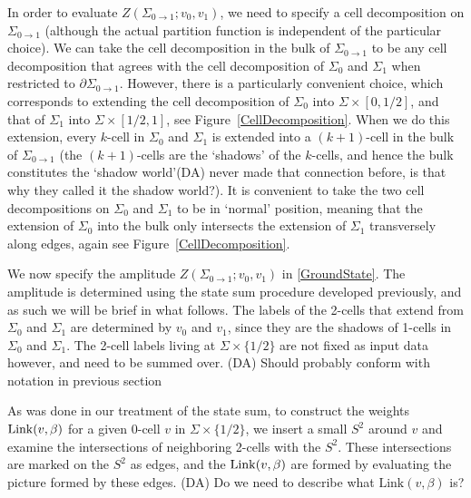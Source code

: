 \documentclass[12pt,a4paper]{article}
\newcounter{arrow}
\newcommand{\ra}{\rightarrow}
\newcommand{\dave}[1]{{\color{ao(english)}\footnotesize{(DA) #1}}}
\begin{document}
In order to evaluate $Z(\Sigma_{0\ra1}; v_0, v_1)$, we need to specify a cell decomposition on $\Sigma_{0\ra 1}$ (although the actual partition function is independent of the particular choice). 
We can take the cell decomposition in the bulk of $\Sigma_{0\ra1}$ to be any cell decomposition that agrees with the cell decomposition of $\Sigma_0$ and $\Sigma_1$ when restricted to $\partial \Sigma_{0\ra1}$.
However, there is a particularly convenient choice, which corresponds to extending the cell decomposition of $\Sigma_0$ into $\Sigma \times [0, 1/2]$, and that of $\Sigma_1$ into $\Sigma \times [1/2, 1]$, see Figure~\ref{CellDecomposition}. 
When we do this extension, every $k$-cell in $\Sigma_0$ and $\Sigma_1$ is extended into a $(k+1)$-cell in the bulk 
of $\Sigma_{0\ra1}$ (the $(k+1)$-cells are the `shadows' of the $k$-cells, and hence the bulk constitutes the `shadow world'\dave{never made that connection before, is that why they called it the shadow world?}). 
It is convenient to take the two cell decompositions on $\Sigma_0$ and $\Sigma_1$ to be in `normal' position,
meaning that the extension of $\Sigma_0$ into the bulk only intersects the extension of $\Sigma_1$ transversely along edges, again see Figure~\ref{CellDecomposition}.


We now specify the amplitude $Z(\Sigma_{0\ra 1}; v_0, v_1) $ in \eqref{GroundState}.
The amplitude is determined using the state sum procedure developed previously, and as such we will be brief in what follows. 
The labels of the 2-cells that extend from $\Sigma_0$ and $\Sigma_1$ are determined by $v_0$ and 
$v_1$, since they are the shadows of 1-cells in $\Sigma_0$ and $\Sigma_1$. 
The 2-cell labels living at $\Sigma \times \{ 1/2 \}$ are not fixed as input data however, and need to be 
summed over.
\dave{Should probably conform with notation in previous section}

As was done in our treatment of the state sum, to construct the weights ${\rm Link}(v,\beta)$ for a given 0-cell $v$ in $\Sigma \times \{1/2\}$, we insert a small $S^2$ around 
$v$ and examine the intersections of neighboring 2-cells with the $S^2$. These intersections 
are marked on the $S^2$ as edges, and the ${\rm Link}(v,\beta)$ are formed by evaluating 
the picture formed by these edges. 
\dave{Do we need to describe what $\text{Link}(v,\beta)$ is?}
\end{document}
